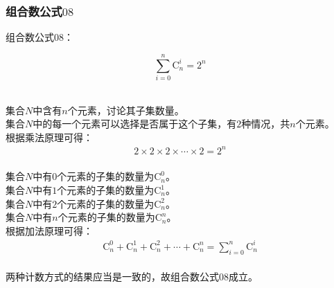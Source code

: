 \documentclass[UTF8]{ctexart}
\newcommand{\Co}{\mathrm{C}}
\begin{document}
\newpage

\subsubsection{组合数公式$08$}
    组合数公式$08$：
    \begin{large}
        \begin{equation*}
            \sum_{i=0}^n\Co_n^i=2^n
        \end{equation*}
    \end{large}\\
    集合$N$中含有$n$个元素，讨论其子集数量。\\[3mm]
    集合$N$中的每一个元素可以选择是否属于这个子集，有$2$种情况，共$n$个元素。\\[3mm]
    根据乘法原理可得：
    \begin{align}
        2\times 2\times 2\times\cdots\times 2=2^n
    \end{align}\\
    集合$N$中有$0$个元素的子集的数量为$\Co_n^0$。\\[3mm]
    集合$N$中有$1$个元素的子集的数量为$\Co_n^1$。\\[3mm]
    集合$N$中有$2$个元素的子集的数量为$\Co_n^2$。\\[3mm]
    集合$N$中有$n$个元素的子集的数量为$\Co_n^n$。\\[3mm]
    根据加法原理可得：
    \setcounter{equation}{0}
    \begin{align}
        \Co_n^0+\Co_n^1+\Co_n^2+\cdots+\Co_n^n=\sum_{i=0}^n\Co_n^i
    \end{align}\\
    两种计数方式的结果应当是一致的，故组合数公式$08$成立。

\newpage
\end{document}

